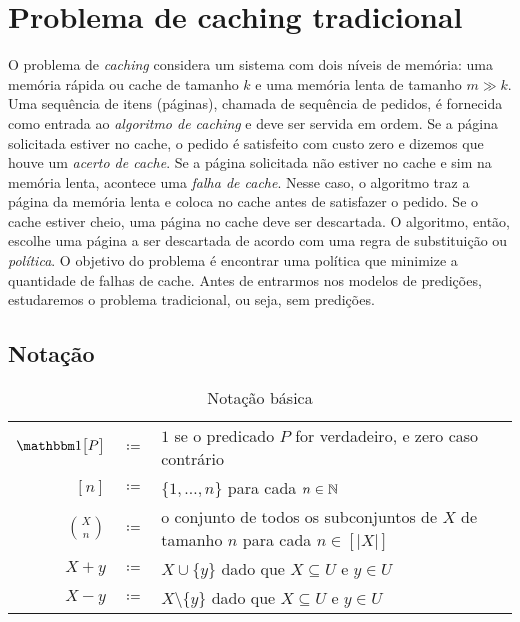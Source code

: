 \chapter{Problema de caching tradicional}

O problema de \emph{caching} considera um sistema com dois níveis de memória: uma memória rápida ou cache de tamanho \(k\) e uma memória lenta de tamanho \(m \gg k\). Uma sequência de itens (páginas), chamada de sequência de pedidos, é fornecida como entrada ao \emph{algoritmo de caching} e deve ser servida em ordem. Se a página solicitada estiver no cache, o pedido é satisfeito com custo zero e dizemos que houve um \emph{acerto de cache}. Se a página solicitada não estiver no cache e sim na memória lenta, acontece uma \emph{falha de cache}. Nesse caso, o algoritmo traz a página da memória lenta e coloca no cache antes de satisfazer o pedido. Se o cache estiver cheio, uma página no cache deve ser descartada. O algoritmo, então, escolhe uma página a ser descartada de acordo com uma regra de substituição ou \emph{política}. O objetivo do problema é encontrar uma política que minimize a quantidade de falhas de cache. Antes de entrarmos nos modelos de predições, estudaremos o problema tradicional, ou seja, sem predições. 

\section{Notação}

\bgroup
	\renewcommand{\arraystretch}{1.2}
	\begin{table}[htbp]
	  \caption{Notação básica}
          \label{tbl:notation}
	  \centering
	  \begin{tabular}{r c p{13cm}}
	    \toprule
            \(\ind{P}\) & \(\coloneqq\)& \(1\) se o predicado \(P\) for verdadeiro, e zero caso contrário \\
            \([n]\)
            & \(\coloneqq\)
            & \(\{1, \dotsc, n\}\) para cada \(n
              \in \mathbb{N}\)\\
            \(\binom{X}{n}\) & \(\coloneqq\)& o conjunto de todos os subconjuntos de \(X\) de tamanho \(n\) para cada \(n \in [|X|]\) \\
            \(X + y\) & \(\coloneqq\)& \(X \cup \{y\}\) dado que \(X\subseteq U\) e \(y \in U\) \\
            \(X - y\) & \(\coloneqq\)& \(X \setminus \{y\}\) dado que \(X\subseteq U\) e \(y \in U\)\\
            \bottomrule
	  \end{tabular}
	\end{table}
\egroup


